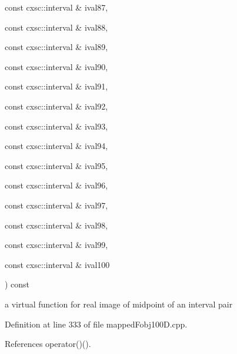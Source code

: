 {{\begin{DoxyParamCaption}
\item[{const cxsc\-::interval \&}]{ival87, }
\item[{const cxsc\-::interval \&}]{ival88, }
\item[{const cxsc\-::interval \&}]{ival89, }
\item[{const cxsc\-::interval \&}]{ival90, }
\item[{const cxsc\-::interval \&}]{ival91, }
\item[{const cxsc\-::interval \&}]{ival92, }
\item[{const cxsc\-::interval \&}]{ival93, }
\item[{const cxsc\-::interval \&}]{ival94, }
\item[{const cxsc\-::interval \&}]{ival95, }
\item[{const cxsc\-::interval \&}]{ival96, }
\item[{const cxsc\-::interval \&}]{ival97, }
\item[{const cxsc\-::interval \&}]{ival98, }
\item[{const cxsc\-::interval \&}]{ival99, }
\item[{const cxsc\-::interval \&}]{ival100}
\end{DoxyParamCaption}
) const}}\label{classsubpavings_1_1MappedFobj100D_a20ebd733b7254a0ea2ef36e1920597e0}


a virtual function for real image of midpoint of an interval pair 



\-Definition at line 333 of file mapped\-Fobj100\-D.\-cpp.



\-References operator()().


